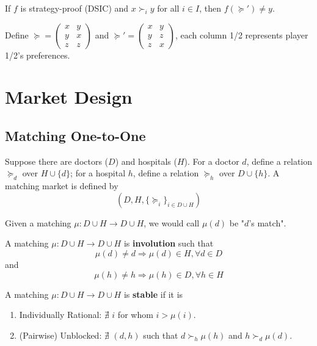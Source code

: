 \documentclass[11pt]{elegantbook}
\begin{document}
\begin{lemma}
    If $f$ is strategy-proof (DSIC) and $x\succ_i y$ for all $i\in I$, then $f(\succeq')\neq y$.
\end{lemma}

\begin{example}
    Define $\succeq=\begin{pmatrix}
        x&y\\
        y&x\\
        z&z
    \end{pmatrix}$ and $\succeq'=\begin{pmatrix}
        x&y\\
        y&z\\
        z&x
    \end{pmatrix}$, each column 1/2 represents player 1/2's preferences.
\end{example}


\chapter{Market Design}

\section{Matching One-to-One}
Suppose there are doctors ($D$) and hospitals ($H$). For a doctor $d$, define a relation $\succeq_d$ over $H\cup\{d\}$; for a hospital $h$, define a relation $\succeq_h$ over $D\cup\{h\}$. A matching market is defined by $$\left(D,H,\{\succeq_i\}_{i\in D\cup H}\right)$$

\begin{note}
    Given a matching $\mu: D\cup H \rightarrow D\cup H$, we would call $\mu(d)$ be "$d$'s match".
\end{note}

\begin{definition}[Involution]
    \normalfont
    A matching $\mu: D\cup H \rightarrow D\cup H$ is \textbf{involution} such that $$\mu (d)\neq d \Rightarrow \mu(d)\in H, \forall d\in D$$ and $$\mu (h)\neq h \Rightarrow \mu(h)\in D, \forall h\in H$$
\end{definition}

\begin{definition}[Stable]
    \normalfont
    A matching $\mu: D\cup H \rightarrow D\cup H$ is \textbf{stable} if it is
    \begin{enumerate}[$\circ$]
        \item Individually Rational: $\nexists$ $i$ for whom $i>\mu(i)$.
        \item (Pairwise) Unblocked: $\nexists$ $(d,h)$ such that $d\succ_h \mu(h)$ and $h\succ_d \mu(d)$.
    \end{enumerate}
\end{definition}
\end{document}
